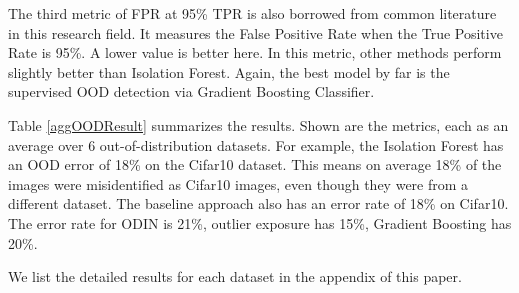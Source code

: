 \documentclass{article}
\begin{document}
The third metric of FPR at 95\% TPR is also borrowed from common literature in this research field. It measures the False Positive Rate when the True Positive Rate is 95\%.  A lower value is better here. In this metric, other methods perform slightly better than Isolation Forest. Again, the best model by far is the supervised OOD detection via Gradient Boosting Classifier.

Table \ref{aggOODResult} summarizes the results. Shown are the metrics, each as an average over 6 out-of-distribution datasets. For example, the Isolation Forest has an OOD error of 18\% on the Cifar10 dataset. This means on average 18\% of the images were misidentified as Cifar10 images, even though they were from a different dataset. The baseline approach also has an error rate of 18\% on Cifar10. The error rate for ODIN is 21\%, outlier exposure has 15\%, Gradient Boosting has 20\%.

We list the detailed results for each dataset in the appendix of this paper.
\end{document}
